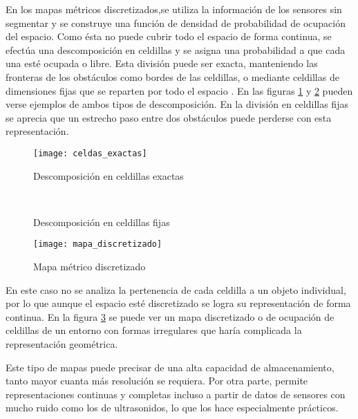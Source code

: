 En los mapas métricos discretizados,se utiliza la información de los sensores sin segmentar y se construye una función de densidad de probabilidad de ocupación del espacio. Como ésta no puede cubrir todo el espacio de forma continua, se efectúa una descomposición en celdillas y se asigna una probabilidad a que cada una esté ocupada o libre. Esta división puede ser exacta, manteniendo las fronteras de los obstáculos como bordes de las celdillas, o mediante celdillas de dimensiones fijas que se reparten por todo el espacio \cite{Siegwart04}. En las figuras \ref{fg:exactas} y \ref{fg:fijas} pueden verse ejemplos de ambos tipos de descomposición. En la división en celdillas fijas se aprecia que un estrecho paso entre dos obstáculos puede perderse con esta representación.

 \begin{figure}[hbt]
  \centering\texttt{[image: celdas\_exactas]}\\
  \caption{Descomposición en celdillas exactas}\label{fg:exactas}
\end{figure}

\begin{figure}[hbt]
    \\
  \caption{Descomposición en celdillas fijas}\label{fg:fijas}
\end{figure}

\begin{figure}[hbt]
  \centering\texttt{[image: mapa\_discretizado]}\\
  \caption{Mapa métrico discretizado}\label{fg:discretizado}
\end{figure}


 En este caso no se analiza la pertenencia de cada celdilla a un objeto individual, por lo que aunque el espacio esté discretizado se logra su representación de forma continua. En la figura \ref{fg:discretizado} se puede ver un mapa discretizado o de ocupación de celdillas de un entorno con formas irregulares que haría complicada la representación geométrica.

Este tipo de mapas puede precisar de una alta capacidad de almacenamiento, tanto mayor cuanta más resolución se requiera. Por otra parte, permite representaciones continuas y completas incluso a partir de datos de sensores con mucho ruido como los de ultrasonidos, lo que los hace especialmente prácticos.

